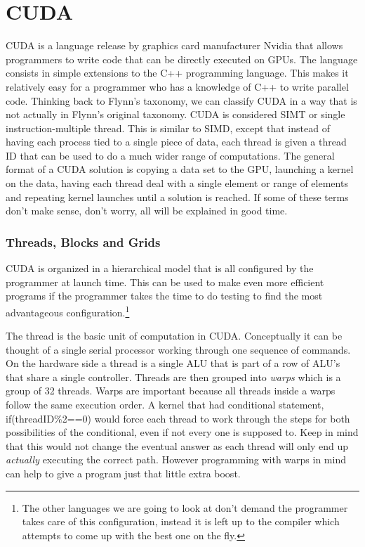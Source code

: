 \documentclass{article}
\newcommand{\comp}[1]{{\ttfamily #1}}
\begin{document}
\part{CUDA}
CUDA is a language release by graphics card manufacturer Nvidia that allows programmers to write code that can be directly executed on GPUs. The language consists in simple extensions to the C++ programming language. This makes it relatively easy for a programmer who has a knowledge of C++ to write parallel code. Thinking back to Flynn's taxonomy, we can classify CUDA in a way that is not actually in Flynn's original taxonomy. CUDA is considered SIMT or single instruction-multiple thread. This is similar to SIMD, except that instead of having each process tied to a single piece of data, each thread is given a thread ID that can be used to do a much wider range of computations. The general format of a CUDA solution is copying a data set to the GPU, launching a kernel on the data, having each thread deal with a single element or range of elements and repeating kernel launches until a solution is reached. If some of these terms don't make sense, don't worry, all will be explained in good time.

	\section{Threads, Blocks and Grids}

    CUDA is organized in a hierarchical model that is all configured by the programmer at launch time. This can be used to make even more efficient programs if the programmer takes the time to do testing to find the most advantageous configuration.\footnote{The other languages we are going to look at don't demand the programmer takes care of this configuration, instead it is left up to the compiler which attempts to come up with the best one on the fly.}

    The thread is the basic unit of computation in CUDA. Conceptually it can be thought of a single serial processor working through one sequence of commands. On the hardware side a thread is a single ALU that is part of a row of ALU's that share a single controller. Threads are then grouped into \emph{warps} which is a group of 32 threads. Warps are important because all threads inside a warps follow the same execution order. A kernel that had conditional statement, \comp{if(threadID\%2==0)} would force each thread to work through the steps for both possibilities of the conditional, even if not every one is supposed to. Keep in mind that this would not change the eventual answer as each thread will only end up \emph{actually} executing the correct path. However programming with warps in mind can help to give a program just that little extra boost.
\end{document}
